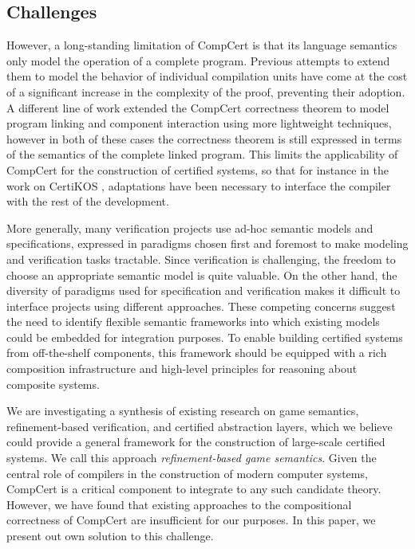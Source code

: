 \documentclass[sigplan,10pt,review,anonymous]{acmart}
\begin{document}

\subsection{Challenges} %

However,
a long-standing limitation of CompCert is that
its language semantics
only model the operation of a complete program.
Previous attempts to extend them
to model the behavior of individual compilation units
\cite{compcompcert,cpp15}
have come at the cost of a significant increase
in the complexity of the proof,
preventing their adoption.
A different line of work
extended the CompCert correctness theorem
to model program linking \cite{sepcompcert}
and component interaction \cite{compcertm}
using more lightweight techniques,
however in both of these cases
the correctness theorem is still expressed in terms of
the semantics of the complete linked program.
This limits the applicability of CompCert
for the construction of certified systems,
so that for instance in the work on CertiKOS \cite{popl15,osdi16,ccal},
adaptations have been necessary
to interface the compiler with the rest of the development.

More generally, many verification projects
use ad-hoc semantic models and specifications,
expressed in paradigms chosen first and foremost
to make modeling and verification tasks tractable.
Since verification is challenging,
the freedom to choose an appropriate semantic model
is quite valuable.
On the other hand,
the diversity of paradigms used for specification and verification
makes it difficult
to interface projects using different approaches.
These competing concerns
suggest the need to identify %
flexible semantic frameworks
into which existing models could be embedded
for integration purposes.
To enable building certified systems
from off-the-shelf components,
this framework should be equipped with
a rich composition infrastructure
and high-level principles for
reasoning about composite systems.

We are investigating
a synthesis of existing research
on game semantics,
refinement-based verification,
and certified abstraction layers,
which we believe
could provide a general framework
for the construction of large-scale certified systems.
We call this approach \emph{refinement-based game semantics}.
Given the central role of compilers
in the construction of modern computer systems,
CompCert is a critical component
to integrate to any such candidate theory.
However,
we have found that existing approaches
to the compositional correctness of CompCert
are insufficient for our purposes.
In this paper,
we present out own solution to this challenge.
\end{document}
